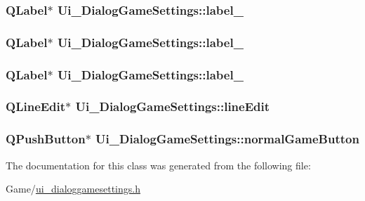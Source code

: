\hypertarget{class_ui___dialog_game_settings_acd81adc6c389863807a80eaa648914fa}{
\subsubsection[{label\-\_\-2}]{\setlength{\rightskip}{0pt plus 5cm}Q\-Label$\ast$ Ui\-\_\-\-Dialog\-Game\-Settings\-::label\-\_}}\label{class_ui___dialog_game_settings_acd81adc6c389863807a80eaa648914fa}
\hypertarget{class_ui___dialog_game_settings_a8d29fcac63609c2780a1ed61d40f7597}{
\subsubsection[{label\-\_\-3}]{\setlength{\rightskip}{0pt plus 5cm}Q\-Label$\ast$ Ui\-\_\-\-Dialog\-Game\-Settings\-::label\-\_}}\label{class_ui___dialog_game_settings_a8d29fcac63609c2780a1ed61d40f7597}
\hypertarget{class_ui___dialog_game_settings_a29b446cc3b25e8f886ffb8f3a3917ca9}{
\subsubsection[{label\-\_\-4}]{\setlength{\rightskip}{0pt plus 5cm}Q\-Label$\ast$ Ui\-\_\-\-Dialog\-Game\-Settings\-::label\-\_}}\label{class_ui___dialog_game_settings_a29b446cc3b25e8f886ffb8f3a3917ca9}
\hypertarget{class_ui___dialog_game_settings_a742bcceb2e255a8dd0916aa91510a6ce}{
\subsubsection[{line\-Edit}]{\setlength{\rightskip}{0pt plus 5cm}Q\-Line\-Edit$\ast$ Ui\-\_\-\-Dialog\-Game\-Settings\-::line\-Edit}}\label{class_ui___dialog_game_settings_a742bcceb2e255a8dd0916aa91510a6ce}
\hypertarget{class_ui___dialog_game_settings_a40ae5b6fb421789d7586b3f4988eada7}{
\subsubsection[{normal\-Game\-Button}]{\setlength{\rightskip}{0pt plus 5cm}Q\-Push\-Button$\ast$ Ui\-\_\-\-Dialog\-Game\-Settings\-::normal\-Game\-Button}}\label{class_ui___dialog_game_settings_a40ae5b6fb421789d7586b3f4988eada7}


The documentation for this class was generated from the following file\-:\begin{DoxyCompactItemize}
\item 
Game/\hyperlink{ui__dialoggamesettings_8h}{ui\-\_\-dialoggamesettings.\-h}\end{DoxyCompactItemize}
